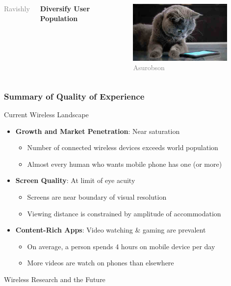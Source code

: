 \documentclass[10pt]{beamer}
\begin{document}
\begin{frame}
\begin{columns}
\begin{center}
  {\tiny \textcolor{gray}{\textcopyright Ravishly}}
  \end{center}
  \textbf{Diversify User Population}
  \begin{center}
  \includegraphics[width=2in]{Figures/Visual-Animals.jpg}
  {\tiny \textcolor{gray}{\textcopyright Asurobson}}
  \end{center}
\end{columns}
\end{frame}


\begin{frame}
\frametitle{Summary of Quality of Experience}
\begin{block}{Current Wireless Landscape}
  \begin{itemize}
  \item \textbf{Growth and Market Penetration}: Near saturation
    \begin{itemize}
    \item Number of connected wireless devices exceeds world population
    \item Almost every human who wants mobile phone has one (or more)
    \end{itemize}
  \item \textbf{Screen Quality}: At limit of eye acuity
    \begin{itemize}
    \item Screens are near boundary of visual resolution
    \item Viewing distance is constrained by amplitude of accommodation
    \end{itemize}
  \item \textbf{Content-Rich Apps}: Video watching \& gaming are prevalent
    \begin{itemize}
    \item On average, a person spends 4 hours on mobile device per day
    \item More videos are watch on phones than elsewhere
    \end{itemize}
  \end{itemize}
\end{block}
\begin{block}{Wireless Research and the Future}
  \begin{center}
  \end{center}
\end{block}
\end{frame}
\end{document}
